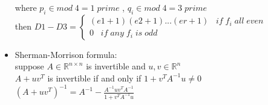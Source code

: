 \begin{itemize}
  where $p_i \in mod\;4 = 1\;prime$ , $q_i \in mod\;4 = 3\;prime$\\
  then $D1 - D3 = \begin{cases}(e1+1)(e2+1)...(er+1)\;\;\;if\;f_i\;all\;even\\0\;\;\;if\;any\;f_i\;is\;odd\end{cases}$
\item Sherman-Morrison formula:\\
  suppose $A \in \mathbb{R}^{n\times n}$ is invertible and $u,v \in \mathbb{R}^n$\\
  $A + uv^T$ is invertible if and only if $1 + v^TA^{-1}u \ne 0$\\
  $(A + uv^T)^{-1} = A^{-1} - \frac{A^{-1}uv^TA^{-1}}{1+v^TA^{-1}u}$\\
\end{itemize}
